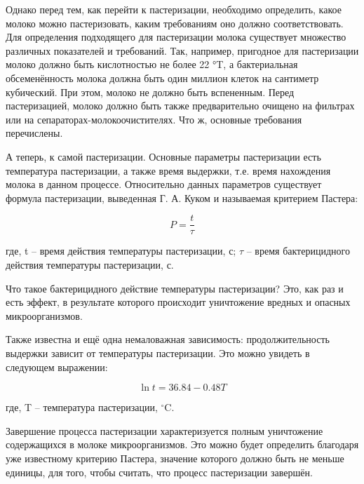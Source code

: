 {  \par \redline Однако перед тем, как перейти к пастеризации, необходимо определить, какое молоко можно пастеризовать, каким требованиям оно должно соответствовать. Для определения подходящего для пастеризации молока существует множество различных показателей и требований. Так, например, пригодное для пастеризации молоко должно быть кислотностью не более 22 °T, а бактериальная обсеменённость молока должна быть один миллион клеток на сантиметр кубический. При этом, молоко не должно быть вспененным. Перед пастеризацией, молоко должно быть также предварительно очищено на фильтрах или на сепараторах-молокоочистителях. Что ж, основные требования перечислены. 

  \par \redline А теперь, к самой пастеризации. Основные параметры пастеризации есть температура пастеризации, а также время выдержки, т.е. время нахождения молока в данном процессе. Относительно данных параметров существует формула пастеризации, выведенная Г. А. Куком и называемая критерием Пастера:
  
  \par

  \[P=\frac{t}{\tau}\]

  где, t {--} время действия температуры пастеризации, с; $\tau$ {--} время бактерицидного действия температуры пастеризации, с.  

  \par \redline Что такое бактерицидного действие температуры пастеризации? Это, как раз и есть эффект, в результате которого происходит уничтожение вредных и опасных микроорганизмов. 

  \par \redline Также известна и ещё одна немаловажная зависимость: продолжительность выдержки зависит от температуры пастеризации. Это можно увидеть в следующем выражении: 
  
  \par 

  \[\ln{t} = 36.84 - 0.48T\]

  где, T {--} температура пастеризации, $^{\circ}$C.

  \par \redline Завершение процесса пастеризации характеризуется полным уничтожение содержащихся в молоке микроорганизмов. Это можно будет определить благодаря уже известному критерию Пастера, значение которого должно быть не меньше единицы, для того, чтобы считать, что процесс пастеризации завершён.  

}

